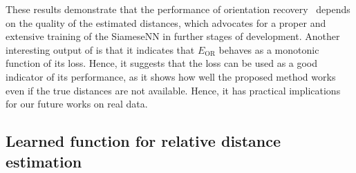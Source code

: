 
These results demonstrate that the performance of orientation recovery~ depends on the quality of the estimated distances, which advocates for a proper and extensive training of the SiameseNN in further stages of development.
Another interesting output of  is that it indicates that $E_\text{OR}$ behaves as a monotonic function of its loss.
Hence, it suggests that the loss can be used as a good indicator of its performance, as it shows how well the proposed method works even if the true distances are not available.
Hence, it has practical implications for our future works on real data.


\subsection{Learned function for relative distance estimation }\label{sec:results:distance-estimation:learned}


